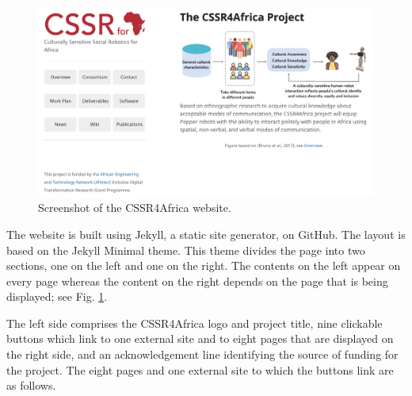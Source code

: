 \documentclass{CSSRforAfrica}
\begin{document}
\begin{figure}[tb]
\begin{center}
\includegraphics[width=140mm,angle=0]{./images/CSSR4Africa_website.png} 
\end{center}
\caption{Screenshot of the CSSR4Africa website.}          
\label{fig:website}                                                                
\end{figure}


The website is built using  Jekyll, a static site generator, on GitHub.   The layout is based on the Jekyll Minimal theme. This theme divides the page into two sections, one on the left and one on the right. The contents on the left appear on every page whereas the content on the right depends on the page that is being displayed; see Fig. \ref{fig:website}.

The left side comprises the CSSR4Africa logo and project title, nine clickable buttons which link to one external site and to eight pages that are displayed on the right side, and an acknowledgement line identifying the source of funding for the project.  The eight pages and one external site to which the buttons link are as follows. 
\end{document}
